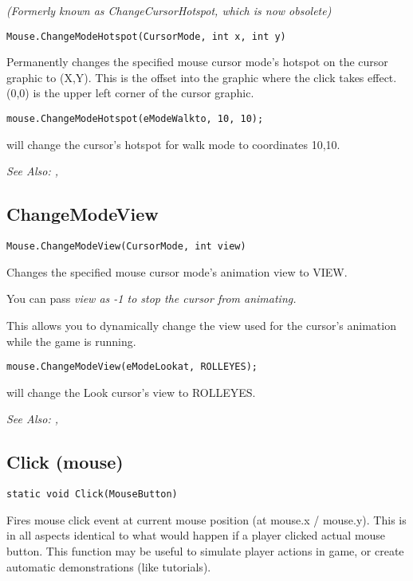 \it{(Formerly known as ChangeCursorHotspot, which is now obsolete)}

\begin{verbatim}
Mouse.ChangeModeHotspot(CursorMode, int x, int y)
\end{verbatim}
Permanently changes the specified mouse cursor mode's hotspot on the cursor graphic
to (X,Y). This is the offset into the graphic where the click takes effect.
(0,0) is the upper left corner of the cursor graphic.

\begin{verbatim}
mouse.ChangeModeHotspot(eModeWalkto, 10, 10);
\end{verbatim}
will change the cursor's hotspot for walk mode to coordinates 10,10.

\it{See Also:} ,


\subsection{ChangeModeView}\label{Mouse.ChangeModeView}%

\begin{verbatim}
Mouse.ChangeModeView(CursorMode, int view)
\end{verbatim}
Changes the specified mouse cursor mode's animation view to VIEW.

You can pass \it{view} as -1 to stop the cursor from animating.

This allows you to dynamically change the view used for the cursor's animation
while the game is running.

\begin{verbatim}
mouse.ChangeModeView(eModeLookat, ROLLEYES);
\end{verbatim}
will change the Look cursor's view to ROLLEYES.

\it{See Also:} ,


\subsection{Click (mouse)}\label{Mouse.Click}%

\begin{verbatim}
static void Click(MouseButton)
\end{verbatim}
Fires mouse click event at current mouse position (at mouse.x / mouse.y).
This is in all aspects identical to what would happen if a player clicked
actual mouse button. This function may be useful to simulate player actions
in game, or create automatic demonstrations (like tutorials).

